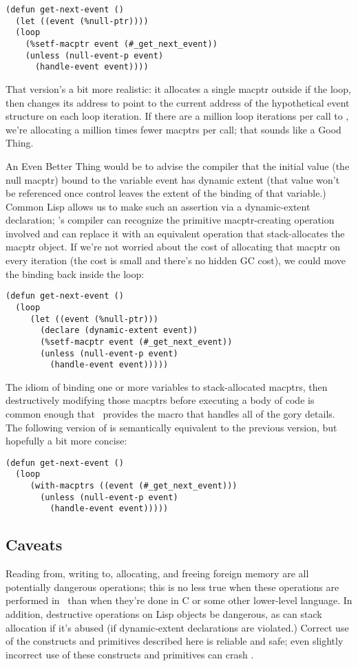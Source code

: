 \begin{lstlisting}
(defun get-next-event ()
  (let ((event (%null-ptr))))
  (loop
    (%setf-macptr event (#_get_next_event))
    (unless (null-event-p event)
      (handle-event event))))
\end{lstlisting}

That version's a bit more realistic: it allocates a single macptr
outside if the loop, then changes its address to point to the current
address of the hypothetical event structure on each loop iteration. If
there are a million loop iterations per call to ,
we're allocating a million times fewer macptrs per call; that
sounds like a Good Thing.

An Even Better Thing would be to advise the compiler that the initial
value (the null macptr) bound to the variable event has dynamic extent
(that value won't be referenced once control leaves the extent of the
binding of that variable.) Common Lisp allows us to make such an
assertion via a dynamic-extent declaration; \CCL's compiler can
recognize the primitive macptr-creating operation involved and can
replace it with an equivalent operation that stack-allocates the
macptr object. If we're not worried about the cost of allocating that
macptr on every iteration (the cost is small and there's no hidden GC
cost), we could move the binding back inside the loop:

\begin{lstlisting}
(defun get-next-event ()
  (loop
     (let ((event (%null-ptr)))
       (declare (dynamic-extent event))
       (%setf-macptr event (#_get_next_event))
       (unless (null-event-p event)
         (handle-event event)))))
\end{lstlisting}

The idiom of binding one or more variables to stack-{}allocated
macptrs, then destructively modifying those macptrs before executing a
body of code is common enough that \CCL\ provides the macro
 that handles all of the gory details. The following
version of  is semantically equivalent to the
previous version, but hopefully a bit more concise:

\begin{lstlisting}
(defun get-next-event ()
  (loop
     (with-macptrs ((event (#_get_next_event)))
       (unless (null-event-p event)
         (handle-event event)))))
\end{lstlisting}


\subsection{Caveats}

Reading from, writing to, allocating, and freeing foreign memory are
all potentially dangerous operations; this is no less true when these
operations are performed in \CCL\ than when they're done in C or some
other lower-level language. In addition, destructive operations on
Lisp objects be dangerous, as can stack allocation if it's abused (if
dynamic-extent declarations are violated.)  Correct use of the
constructs and primitives described here is reliable and safe; even
slightly incorrect use of these constructs and primitives can crash
\CCL.

